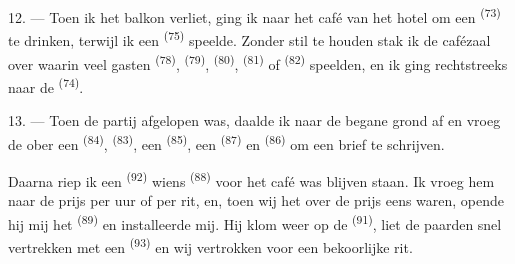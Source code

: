 12. --- Toen ik het balkon verliet, ging ik naar het café van het hotel om een
 \textsuperscript{(73)} te drinken, terwijl ik een
 \textsuperscript{(75)} speelde. Zonder stil te houden
stak ik de cafézaal over waarin veel gasten  \textsuperscript{(78)},
 \textsuperscript{(79)},
 \textsuperscript{(80)}, 
\textsuperscript{(81)} of  \textsuperscript{(82)} speelden, en ik ging
rechtstreeks naar de  \textsuperscript{(74)}.

13. --- Toen de partij afgelopen was, daalde ik naar de begane grond af en vroeg de ober een
 \textsuperscript{(84)},  \textsuperscript{(83)}, een
 \textsuperscript{(85)}, een
 \textsuperscript{(87)} en  \textsuperscript{(86)} om
een brief te schrijven.

Daarna riep ik een  \textsuperscript{(92)} wiens
 \textsuperscript{(88)} voor het café was blijven staan. Ik vroeg
hem naar de prijs per uur of per rit, en, toen wij het over de prijs eens waren, opende hij
mij het  \textsuperscript{(89)} en installeerde mij. Hij klom weer op de
 \textsuperscript{(91)}, liet de paarden snel vertrekken met een 
\textsuperscript{(93)} en wij vertrokken voor een bekoorlijke rit.
\VUsaut{6.0mm}
\VUfilet{22mm}

